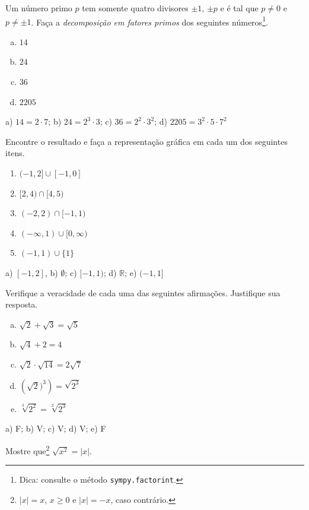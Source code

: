\begin{exer}
  Um número primo $p$ tem somente quatro divisores $\pm 1$, $\pm p$ e é tal que $p\neq 0$ e $p\neq \pm 1$. Faça a \emph{decomposição em fatores primos} dos seguintes números\footnote{Dica: consulte o método \lstinline+sympy.factorint+.}.
  \begin{enumerate}[a)]
  \item $14$
  \item $24$
  \item $36$
  \item $2205$
  \end{enumerate}
\end{exer}
\begin{resp}
  a) $14 = 2\cdot 7$; b) $24 = 2^3\cdot 3$; c) $36 = 2^2\cdot 3^2$; d) $2205 = 3^2\cdot 5\cdot 7^2$
\end{resp}

\begin{exer}
  Encontre o resultado e faça a representação gráfica em cada um dos seguintes itens.
  \begin{enumerate}
  \item $(-1,2]\cup [-1,0]$
  \item $[2,4)\cap [4,5)$
  \item $(-2,2)\cap [-1,1)$
  \item $(-\infty, 1)\cup [0,\infty)$
  \item $(-1,1)\cup \{1\}$
  \end{enumerate}
\end{exer}
\begin{resp}
  a) $[-1,2]$, b) $\emptyset$; c) $[-1,1)$; d) $\mathbb{R}$; e) $(-1,1]$
\end{resp}

\begin{exer}
  Verifique a veracidade de cada uma das seguintes afirmações. Justifique sua resposta.
  \begin{enumerate}[a)]
  \item $\sqrt{2} + \sqrt{3} = \sqrt{5}$
  \item $\sqrt{4} + 2 = 4$
  \item $\sqrt{2}\cdot\sqrt{14} = 2\sqrt{7}$
  \item $\left(\sqrt{2})^3\right)=\sqrt{2^3}$
  \item $\sqrt[3]{2^2}=\sqrt[2]{2^3}$
  \end{enumerate}
\end{exer}
\begin{resp}
  a) F; b) V; c) V; d) V; e) F
\end{resp}

\begin{exer}
  Mostre que\footnote{$|x|=x$, $x\geq0$ e $|x|=-x$, caso contrário.} $\sqrt{x^2}=|x|$.
\end{exer}
